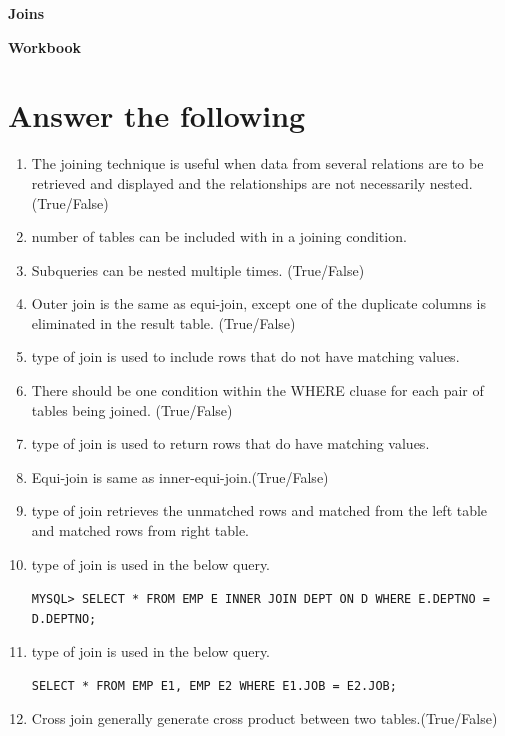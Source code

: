 \documentclass[11pt,a4paper]{article}
\begin{document}
\centerline{\huge{ \textbf{Joins}}}

\vspace{1pc}

\centerline{\Large{ \textbf{Workbook}}}
\section*{Answer the following}

\begin{enumerate}\itemsep10pt

\item The joining technique is useful when data from several relations are to be retrieved and displayed and the relationships are not necessarily nested. (True/False)

\item \underline{\hspace{3cm}} number of tables can be included with in a joining condition. 

\item Subqueries can be nested multiple times. (True/False)\underline{\hspace{3cm}}

\item Outer join is the same as equi-join, except one of the duplicate columns is eliminated in the result table. (True/False)

\item \underline{\hspace{3cm}} type of join is used to include rows that do not have matching values.

\item There should be one condition within the WHERE cluase for each pair of tables being joined. (True/False)

\item \underline{\hspace{3cm}} type of join is used to return rows that do have matching values.

\item Equi-join is same as inner-equi-join.(True/False)

\item \underline{\hspace{3cm}} type of join retrieves the unmatched rows and matched from the left table and matched rows from right table.

\item \underline{\hspace{3cm}} type of join is used in the below query.

\texttt{MYSQL> SELECT * FROM EMP E INNER JOIN DEPT ON D WHERE E.DEPTNO = D.DEPTNO;}


\item \underline{\hspace{3cm}} type of join is used in the below query.

\texttt{SELECT * FROM EMP E1, EMP E2 WHERE E1.JOB = E2.JOB;}

\item Cross join generally generate cross product between two tables.(True/False)


\end{enumerate}
\end{document}
